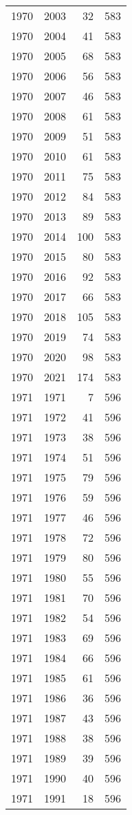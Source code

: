 \documentclass[
  11pt,
  letterpaper,
  DIV=11,
  numbers=noendperiod,
  twoside]{scrartcl}
\begin{document}
\begin{longtable}[]{@{}rrrr@{}}
1970 & 2003 & 32 & 583 \\
1970 & 2004 & 41 & 583 \\
1970 & 2005 & 68 & 583 \\
1970 & 2006 & 56 & 583 \\
1970 & 2007 & 46 & 583 \\
1970 & 2008 & 61 & 583 \\
1970 & 2009 & 51 & 583 \\
1970 & 2010 & 61 & 583 \\
1970 & 2011 & 75 & 583 \\
1970 & 2012 & 84 & 583 \\
1970 & 2013 & 89 & 583 \\
1970 & 2014 & 100 & 583 \\
1970 & 2015 & 80 & 583 \\
1970 & 2016 & 92 & 583 \\
1970 & 2017 & 66 & 583 \\
1970 & 2018 & 105 & 583 \\
1970 & 2019 & 74 & 583 \\
1970 & 2020 & 98 & 583 \\
1970 & 2021 & 174 & 583 \\
1971 & 1971 & 7 & 596 \\
1971 & 1972 & 41 & 596 \\
1971 & 1973 & 38 & 596 \\
1971 & 1974 & 51 & 596 \\
1971 & 1975 & 79 & 596 \\
1971 & 1976 & 59 & 596 \\
1971 & 1977 & 46 & 596 \\
1971 & 1978 & 72 & 596 \\
1971 & 1979 & 80 & 596 \\
1971 & 1980 & 55 & 596 \\
1971 & 1981 & 70 & 596 \\
1971 & 1982 & 54 & 596 \\
1971 & 1983 & 69 & 596 \\
1971 & 1984 & 66 & 596 \\
1971 & 1985 & 61 & 596 \\
1971 & 1986 & 36 & 596 \\
1971 & 1987 & 43 & 596 \\
1971 & 1988 & 38 & 596 \\
1971 & 1989 & 39 & 596 \\
1971 & 1990 & 40 & 596 \\
1971 & 1991 & 18 & 596 \\

\end{longtable}
\end{document}
